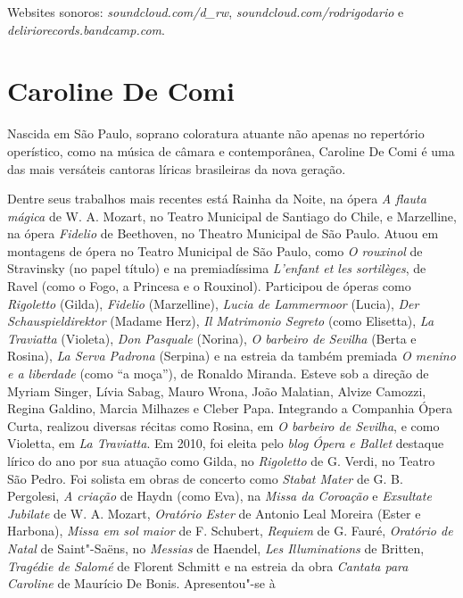 Websites sonoros: \emph{soundcloud.com/d\_rw}, \emph{soundcloud.com/rodrigodario} e \emph{deliriorecords.bandcamp.com}. 

\pagebreak

\section{Caroline De Comi}

Nascida em São Paulo, soprano coloratura atuante não apenas no
repertório operístico, como na música de câmara e contemporânea,
Caroline De Comi é uma das mais versáteis cantoras líricas brasileiras
da nova geração.

Dentre seus trabalhos mais recentes está Rainha da Noite, na ópera
\emph{A flauta mágica} de W. A. Mozart, no Teatro Municipal de Santiago
do Chile, e Marzelline, na ópera \emph{Fidelio} de Beethoven, no Theatro
Municipal de São Paulo. Atuou em montagens de ópera no Teatro Municipal
de São Paulo, como \emph{O rouxinol} de Stravinsky (no papel título) e
na premiadíssima \emph{L'enfant et les sortilèges}, de Ravel (como o
Fogo, a Princesa e o Rouxinol). Participou de óperas como
\emph{Rigoletto} (Gilda), \emph{Fidelio} (Marzelline), \emph{Lucia de
Lammermoor} (Lucia), \emph{Der Schauspieldirektor} (Madame Herz),
\emph{Il Matrimonio Segreto} (como Elisetta), \emph{La Traviatta}
(Violeta), \emph{Don Pasquale} (Norina), \emph{O barbeiro de Sevilha}
(Berta e Rosina), \emph{La Serva Padrona} (Serpina) e na estreia da
também premiada \emph{O menino e a liberdade} (como ``a moça''), de
Ronaldo Miranda. Esteve sob a direção de Myriam Singer, Lívia Sabag,
Mauro Wrona, João Malatian, Alvize Camozzi, Regina Galdino, Marcia
Milhazes e Cleber Papa. Integrando a Companhia Ópera Curta, realizou
diversas récitas como Rosina, em \emph{O barbeiro de Sevilha}, e como
Violetta, em \emph{La Traviatta}. Em 2010, foi eleita pelo \emph{blog
Ópera e Ballet} destaque lírico do ano por sua atuação como Gilda, no
\emph{Rigoletto} de G. Verdi, no Teatro São Pedro. Foi solista em obras
de concerto como \emph{Stabat Mater} de G. B. Pergolesi, \emph{A
criação} de Haydn (como Eva), na \emph{Missa da Coroação} e
\emph{Exsultate Jubilate} de W. A. Mozart, \emph{Oratório Ester} de
Antonio Leal Moreira (Ester e Harbona), \emph{Missa em sol maior} de F.
Schubert, \emph{Requiem} de G. Fauré, \emph{Oratório de Natal} de
Saint"-Saëns, no \emph{Messias} de Haendel, \emph{Les Illuminations} de
Britten, \emph{Tragédie de Salomé} de Florent Schmitt e na estreia da
obra \emph{Cantata para Caroline} de Maurício De Bonis. Apresentou"-se à
